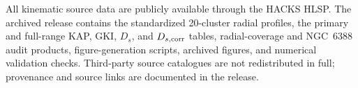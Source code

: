All kinematic source data are publicly available through the HACKS HLSP. The archived release contains the standardized 20-cluster radial profiles, the primary and full-range KAP, GKI, $D_s$, and $D_{s,\rm corr}$ tables, radial-coverage and NGC~6388 audit products, figure-generation scripts, archived figures, and numerical validation checks. Third-party source catalogues are not redistributed in full; provenance and source links are documented in the release.